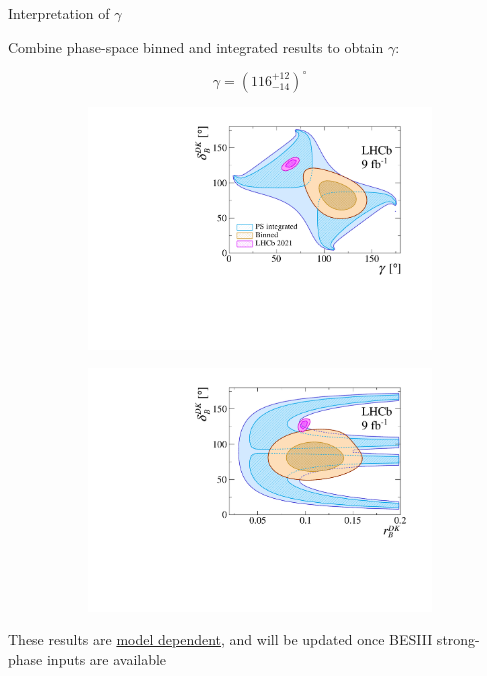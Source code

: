 \documentclass{beamer}
\begin{document}
\begin{frame}{Interpretation of $\gamma$}
  \begin{center}
    \Large Combine phase-space binned and integrated results to obtain $\gamma$:
  \end{center}
  \begin{equation*}
    \gamma = (116^{+12}_{-14})^\circ
  \end{equation*}
  \begin{figure}[htb]
    \centering
    \begin{subfigure}{0.5\textwidth}
      \includegraphics[width=1\textwidth]{Plots/gammacharm_lhcb_KKpipi_GLW_KKpipi_GGSZ_lhcb_2020_beauty_and_charm_g_d_dk.pdf}  
    \end{subfigure}%
    \begin{subfigure}{0.5\textwidth}
      \includegraphics[width=1\textwidth]{Plots/gammacharm_lhcb_KKpipi_GLW_KKpipi_GGSZ_lhcb_2020_beauty_and_charm_r_dk_d_dk.pdf}
    \end{subfigure}
  \end{figure}
  \begin{center}
    {\Large These results are \underline{model dependent}, and will be updated once BESIII strong-phase inputs are available}
  \end{center}
\end{frame}
\end{document}
